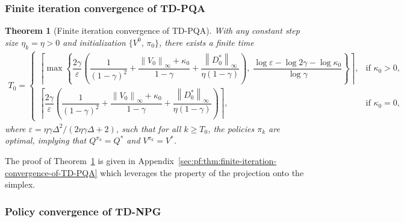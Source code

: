 \documentclass[10pt]{article}
\newcommand{\ls}{\left}
\newcommand{\rs}{\right}
\theoremstyle{plain}
\newtheorem{theorem}{Theorem}[section]
\theoremstyle{definition}
\begin{document}
\subsubsection{Finite iteration convergence of TD-PQA}
\begin{theorem}[Finite iteration convergence of TD-PQA]
    With any constant step size $\eta_k = \eta > 0$ and initialization $\{ V^0, \, \pi_0 \}$, there exists a finite time 
    \begin{align*}
        T_0 \!=\! \begin{cases}
            \!\ls\lceil \max  \ls\{ \dfrac{2\gamma}{\varepsilon} \!\ls( \dfrac{1}{(1-\gamma)^2}\!+\!\dfrac{\ls\| V_0 \rs\|_\infty \!+\! \kappa_0}{1-\gamma} \!+\! \dfrac{\ls\| D_0^* \rs\|_\infty}{\eta(1-\gamma)} \rs)\!, \; \dfrac{\log\varepsilon \!-\! \log 2\gamma \!-\! \log \kappa_0}{\log \gamma} \rs\} \!\rs\rceil, & \!\mbox{if } \kappa_0 > 0, \\[.7em]
            \!\ls\lceil \dfrac{2\gamma}{\varepsilon} \ls( \dfrac{1}{(1-\gamma)^2}\!+\!\dfrac{\ls\| V_0 \rs\|_\infty \!+\! \kappa_0}{1-\gamma} + \dfrac{\ls\| D_0^* \rs\|_\infty}{\eta(1-\gamma)} \rs) \rs\rceil, & \!\mbox{if } \kappa_0 = 0,
        \end{cases}  
    \end{align*}
    where $\varepsilon=\eta\gamma\Delta^2/(2\eta\gamma\Delta+2)$, such that for all $k\ge T_0$, the policies $\pi_k$ are optimal, implying that $Q^{\pi_k}=Q^*$ and $V^{\pi_k}=V^*$.
    \label{thm:finite-iteration-convergence-of-TD-PQA}
\end{theorem}
The proof of Theorem~\ref{thm:finite-iteration-convergence-of-TD-PQA} is given in Appendix~\ref{sec:pf:thm:finite-iteration-convergence-of-TD-PQA} which leverages the property of the projection onto the simplex. %

\subsubsection{Policy convergence of TD-NPG}
\end{document}
